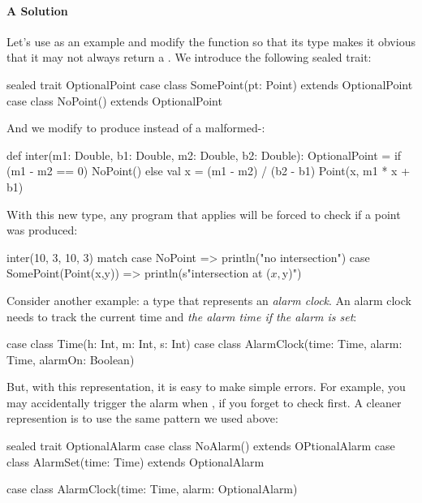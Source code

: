 \documentclass[9pt]{extbook}
\begin{document}
\paragraph{A Solution}

Let's use  as an example and modify the function so that its type
makes it obvious that it may not always return a . We introduce
the following sealed trait:

\begin{scalacode}
sealed trait OptionalPoint
case class SomePoint(pt: Point) extends OptionalPoint
case class NoPoint() extends OptionalPoint
\end{scalacode}

And we modify  to produce  instead of a malformed-:

\begin{scalacode}
def inter(m1: Double, b1: Double, m2: Double, b2: Double): OptionalPoint = {
  if (m1 - m2 == 0) {
    NoPoint()
  }
  else {
    val x = (m1 - m2) / (b2 - b1)
    Point(x, m1 * x + b1)
  }
}
\end{scalacode}

With this new type, any program that applies  will be forced to check if
a point was produced:

\begin{scalacode}
  inter(10, 3, 10, 3) match {
    case NoPoint => println("no intersection")
    case SomePoint(Point(x,y)) => println(s"intersection at ($x, $y)")
  }
\end{scalacode}

Consider another example: a type that represents an \emph{alarm clock}. An alarm
clock needs to track the current time and \emph{the alarm time if the alarm is set}:

\begin{scalacode}
case class Time(h: Int, m: Int, s: Int)
case class AlarmClock(time: Time, alarm: Time, alarmOn: Boolean)
\end{scalacode}

But, with this representation, it is easy to make simple errors. For example,
you may accidentally trigger the alarm when , if you forget
to check  first. A cleaner represention is to use the same pattern we used
above:

\begin{scalacode}
sealed trait OptionalAlarm
case class NoAlarm() extends OPtionalAlarm
case class AlarmSet(time: Time) extends OptionalAlarm

case class AlarmClock(time: Time, alarm: OptionalAlarm)
\end{scalacode}
\end{document}
